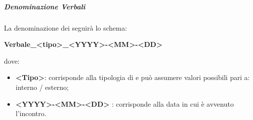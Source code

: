                 \subparagraph{Denominazione Verbali}
                    La denominazione dei  seguirà lo schema:  \\
                    \begin{center}
                        \textbf{Verbale\_<tipo>\_<YYYY>-<MM>-<DD>}
                    \end{center}
                    dove: \\
                    \begin{itemize}
                        \item\textbf{<Tipo>}: corrisponde alla tipologia di  e può assumere valori possibili pari a: interno / esterno;
                        \item\textbf{<YYYY>-<MM>-<DD> }: corrisponde alla data in cui è avvenuto l’incontro.
                    \end{itemize}
